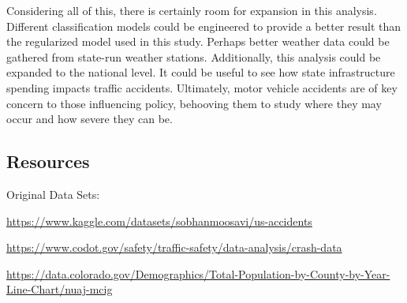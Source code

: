 \documentclass[
]{article}
\begin{document}
\begin{verbatim}
\end{verbatim}

Considering all of this, there is certainly room for expansion in this
analysis. Different classification models could be engineered to provide
a better result than the regularized model used in this study. Perhaps
better weather data could be gathered from state-run weather stations.
Additionally, this analysis could be expanded to the national level. It
could be useful to see how state infrastructure spending impacts traffic
accidents. Ultimately, motor vehicle accidents are of key concern to
those influencing policy, behooving them to study where they may occur
and how severe they can be.

\hypertarget{resources}{%
\subsection{Resources}\label{resources}}

Original Data Sets:

\url{https://www.kaggle.com/datasets/sobhanmoosavi/us-accidents}

\url{https://www.codot.gov/safety/traffic-safety/data-analysis/crash-data}

\url{https://data.colorado.gov/Demographics/Total-Population-by-County-by-Year-Line-Chart/nuaj-mcig}
\end{document}
